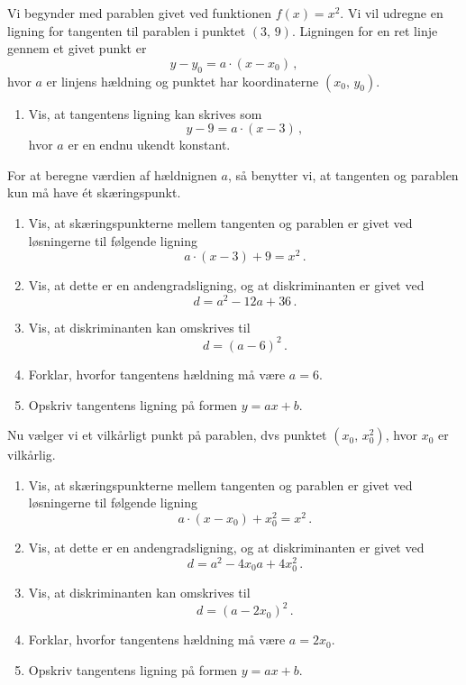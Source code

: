 \documentclass[12pt,oneside,a4paper]{article}
\theoremstyle{plain}
\begin{document}
Vi begynder med parablen givet ved funktionen $f(x)=x^2$. Vi vil udregne en ligning 
for tangenten til parablen i punktet $(3,\, 9)$. Ligningen for en ret linje gennem
et givet punkt er 
\[
    y-y_0 = a\cdot (x-x_0) \,,
\]
hvor $a$ er linjens hældning og punktet har koordinaterne $(x_0,\, y_0)$.

\begin{enumerate}[label=(\alph*)]
    \item Vis, at tangentens ligning kan skrives som 
        \[
            y-9 = a\cdot(x-3)\,,
        \]
    hvor $a$ er en endnu ukendt konstant.
\end{enumerate}
For at beregne værdien af hældnignen $a$, så benytter vi, at tangenten og parablen
kun må have ét skæringspunkt.

\begin{enumerate}[label=(\alph*), resume]
    \item Vis, at skæringspunkterne mellem tangenten og parablen er givet
        ved løsningerne til følgende ligning
        \[
            a\cdot(x-3) + 9 = x^2 \,.
        \]
    \item Vis, at dette er en andengradsligning, og at diskriminanten er givet ved
        \[
            d = a^2 - 12a + 36 \,.
        \]
    \item Vis, at diskriminanten kan omskrives til
        \[
            d = (a-6)^2 \,.
        \]
    \item Forklar, hvorfor tangentens hældning må være $a=6$.
    \item Opskriv tangentens ligning på formen $y=ax+b$.
\end{enumerate}

Nu vælger vi et vilkårligt punkt på parablen, dvs punktet $(x_0,\, x_0^2)$, hvor
$x_0$ er vilkårlig.
\begin{enumerate}[label=(\alph*), resume]
    \item Vis, at skæringspunkterne mellem tangenten og parablen er givet
        ved løsningerne til følgende ligning
        \[
            a\cdot(x-x_0) + x_0^2 = x^2 \,.
        \]
    \item Vis, at dette er en andengradsligning, og at diskriminanten er givet ved
        \[
            d = a^2 - 4x_0a + 4x_0^2 \,.
        \]
    \item Vis, at diskriminanten kan omskrives til
        \[
            d = (a-2x_0)^2 \,.
        \]
    \item Forklar, hvorfor tangentens hældning må være $a=2x_0$.
    \item Opskriv tangentens ligning på formen $y=ax+b$.
\end{enumerate}
\end{document}

